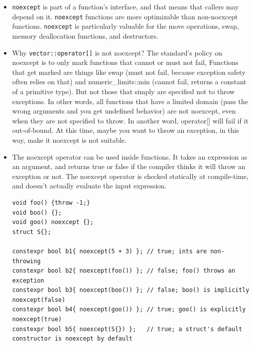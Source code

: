 \documentclass[a4paper,11pt,twoside]{book}
\begin{document}
\begin{itemize}
    \item \texttt{noexcept} is part of a function's interface, and that means that callers may depend on it.  \texttt{noexcept} functions are more optimizable than non-noexcept functions. \texttt{noexcept} is particularly valuable for the move operations, swap, memory deallocation functions, and destructors.

    \item Why \texttt{vector::operator[]} is not noexcept? The standard's policy on noexcept is to only mark functions that cannot or must not fail, Functions that get marked are things like swap (must not fail, because exception safety often relies on that) and numeric\_limits::min (cannot fail, returns a constant of a primitive type). But not those that simply are specified not to throw exceptions. In other words, all functions that have a limited domain (pass the wrong arguments and you get undefined behavior) are not noexcept, even when they are not specified to throw. In another word, operator[] will fail if it out-of-bound. At this time, maybe you want to throw an exception, in this way, make it noexcept is not suitable.


    \item The noexcept operator can be used inside functions. It takes an expression as an argument, and returns true or false if the compiler thinks it will throw an exception or not. The noexcept operator is checked statically at compile-time, and doesn’t actually evaluate the input expression.
\begin{lstlisting}
void foo() {throw -1;}
void boo() {};
void goo() noexcept {};
struct S{};

constexpr bool b1{ noexcept(5 + 3) }; // true; ints are non-throwing
constexpr bool b2{ noexcept(foo()) }; // false; foo() throws an exception
constexpr bool b3{ noexcept(boo()) }; // false; boo() is implicitly noexcept(false)
constexpr bool b4{ noexcept(goo()) }; // true; goo() is explicitly noexcept(true)
constexpr bool b5{ noexcept(S{}) };   // true; a struct's default constructor is noexcept by default
\end{lstlisting}

\end{itemize}
\end{document}
